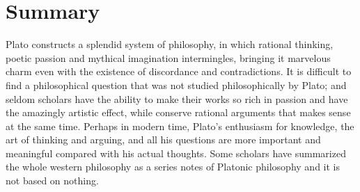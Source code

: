 \documentclass[11pt]{article}
\begin{document}
\section{Summary}
Plato constructs a splendid system of philosophy, in which rational thinking, poetic passion and mythical imagination intermingles, bringing it marvelous charm even with the existence of discordance and contradictions. 
It is difficult to find a philosophical question that was not studied philosophically by Plato; 
and seldom scholars have the ability to make their works so rich in passion and have the amazingly artistic effect, while conserve rational arguments that makes sense at the same time. 
Perhaps in modern time, Plato’s enthusiasm for knowledge, the art of thinking and arguing, and all his questions are more important and meaningful compared with his actual thoughts. 
Some scholars have summarized the whole western philosophy as a series notes of Platonic philosophy and it is not based on nothing.
  
\end{document}
